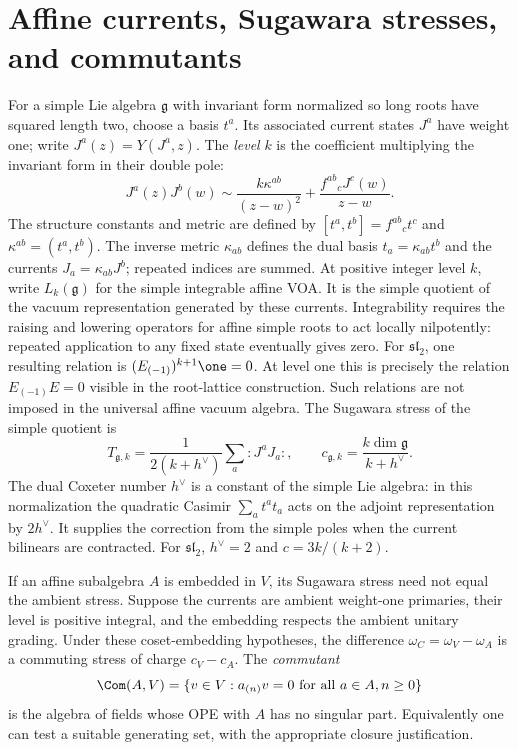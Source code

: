 \section{Affine currents, Sugawara stresses, and commutants}

For a simple Lie algebra $\mathfrak g$ with invariant form normalized
so long roots have squared length two, choose a basis $t^a$.
Its associated current states $J^a$ have weight one; write
$J^a(z)=Y(J^a,z)$. The \emph{level} $k$ is the coefficient
multiplying the invariant form in their double pole:
\[
 J^a(z)J^b(w)\sim\frac{k\kappa^{ab}}{(z-w)^2}
                   +\frac{f^{ab}{}_cJ^c(w)}{z-w}.
\]
The structure constants and metric
are defined by $[t^a,t^b]=f^{ab}{}_c t^c$ and
$\kappa^{ab}=(t^a,t^b)$. The inverse metric $\kappa_{ab}$ defines
the dual basis $t_a=\kappa_{ab}t^b$ and the currents
$J_a=\kappa_{ab}J^b$; repeated indices are summed.
At positive integer level $k$, write $L_k(\mathfrak g)$ for the
simple integrable affine VOA. It is the simple quotient of the
vacuum representation generated by these currents. Integrability
requires the raising and lowering operators for affine simple roots
to act locally nilpotently: repeated application to any fixed state
eventually gives zero. For $\mathfrak{sl}_2$, one resulting relation is
$(E_{(-1)})^{k+1}\one=0$. At level one this is precisely the
relation $E_{(-1)}E=0$ visible in the root-lattice construction.
Such relations are not imposed in the universal affine vacuum algebra.
The Sugawara stress of the simple quotient is
\[
 T_{\mathfrak g,k}=\frac1{2(k+h^\vee)}
       \sum_a:J^aJ_a:,
 \qquad c_{\mathfrak g,k}=\frac{k\dim\mathfrak g}{k+h^\vee}.
\]
The dual Coxeter number $h^\vee$ is a constant of the simple Lie
algebra: in this normalization the quadratic Casimir
$\sum_a t^at_a$ acts on the adjoint representation by $2h^\vee$.
It supplies the correction from the simple poles when the current
bilinears are contracted. For $\mathfrak{sl}_2$, $h^\vee=2$ and
$c=3k/(k+2)$.

If an affine subalgebra $A$ is embedded in $V$, its Sugawara stress
need not equal the ambient stress. Suppose the currents are ambient
weight-one primaries, their level is positive integral, and the
embedding respects the ambient unitary grading. Under these
coset-embedding hypotheses, the difference
$\omega_C=\omega_V-\omega_A$ is a commuting stress of charge
$c_V-c_A$. The \emph{commutant}
\begin{equation}
 \Com(A,V)=\{v\in V:a_{(n)}v=0\text{ for all }a\in A,n\ge0\}
 \label{eq:voa-commutant}
\end{equation}
is the algebra of fields whose OPE with $A$ has no singular part.
Equivalently one can test a suitable generating set, with the
appropriate closure justification.

